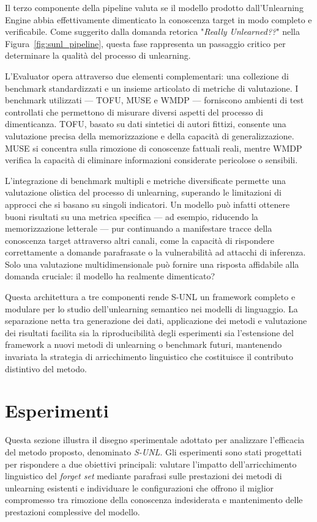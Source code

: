 Il terzo componente della pipeline valuta se il modello prodotto dall'Unlearning Engine abbia effettivamente dimenticato la conoscenza target in modo completo e verificabile. Come suggerito dalla domanda retorica "\textit{Really Unlearned??}" nella Figura~\ref{fig:sunl_pipeline}, questa fase rappresenta un passaggio critico per determinare la qualità del processo di unlearning.

L'Evaluator opera attraverso due elementi complementari: una collezione di benchmark standardizzati e un insieme articolato di metriche di valutazione. I benchmark utilizzati — TOFU, MUSE e WMDP — forniscono ambienti di test controllati che permettono di misurare diversi aspetti del processo di dimenticanza. TOFU, basato su dati sintetici di autori fittizi, consente una valutazione precisa della memorizzazione e della capacità di generalizzazione. MUSE si concentra sulla rimozione di conoscenze fattuali reali, mentre WMDP verifica la capacità di eliminare informazioni considerate pericolose o sensibili.

L'integrazione di benchmark multipli e metriche diversificate permette una valutazione olistica del processo di unlearning, superando le limitazioni di approcci che si basano su singoli indicatori. Un modello può infatti ottenere buoni risultati su una metrica specifica — ad esempio, riducendo la memorizzazione letterale — pur continuando a manifestare tracce della conoscenza target attraverso altri canali, come la capacità di rispondere correttamente a domande parafrasate o la vulnerabilità ad attacchi di inferenza. Solo una valutazione multidimensionale può fornire una risposta affidabile alla domanda cruciale: il modello ha realmente dimenticato?

Questa architettura a tre componenti rende S-UNL un framework completo e modulare per lo studio dell'unlearning semantico nei modelli di linguaggio. La separazione netta tra generazione dei dati, applicazione dei metodi e valutazione dei risultati facilita sia la riproducibilità degli esperimenti sia l'estensione del framework a nuovi metodi di unlearning o benchmark futuri, mantenendo invariata la strategia di arricchimento linguistico che costituisce il contributo distintivo del metodo.

\section{Esperimenti}

Questa sezione illustra il disegno sperimentale adottato per analizzare l’efficacia del metodo proposto, denominato \textit{S-UNL}. Gli esperimenti sono stati progettati per rispondere a due obiettivi principali: valutare l’impatto dell’arricchimento linguistico del \emph{forget set} mediante parafrasi sulle prestazioni dei metodi di unlearning esistenti e individuare le configurazioni che offrono il miglior compromesso tra rimozione della conoscenza indesiderata e mantenimento delle prestazioni complessive del modello.

